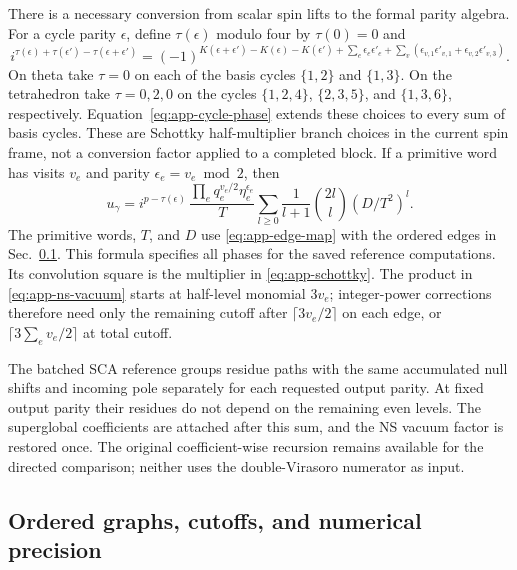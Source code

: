 There is a necessary conversion from scalar spin lifts to the formal
parity algebra. For a cycle parity $\epsilon$, define $\tau(\epsilon)$
modulo four by $\tau(0)=0$ and
\begin{equation}
 i^{\tau(\epsilon)+\tau(\epsilon')-\tau(\epsilon+\epsilon')}
 =(-1)^{K(\epsilon+\epsilon')-K(\epsilon)-K(\epsilon')
            +\sum_e\epsilon_e\epsilon'_e
            +\sum_v(\epsilon_{v,1}\epsilon'_{v,1}
                         +\epsilon_{v,2}\epsilon'_{v,3})}.
 \label{eq:app-cycle-phase}
\end{equation}
On theta take $\tau=0$ on each of the basis cycles $\{1,2\}$ and
$\{1,3\}$. On the tetrahedron take $\tau=0,2,0$ on the cycles
$\{1,2,4\}$, $\{2,3,5\}$, and $\{1,3,6\}$, respectively.
Equation~\eqref{eq:app-cycle-phase} extends these
choices to every sum of basis cycles. These are Schottky
half-multiplier branch choices in the current spin frame, not a
conversion factor applied to a completed block. If a primitive word has visits
$v_e$ and parity $\epsilon_e=v_e\bmod2$, then
\begin{equation}
 u_\gamma=
 i^{p-\tau(\epsilon)}\,
 \frac{\prod_e q_e^{v_e/2}\eta_e^{\epsilon_e}}{T}
 \sum_{l\ge0}\frac1{l+1}\binom{2l}{l}(D/T^2)^l.
 \label{eq:app-half-multiplier}
\end{equation}
The primitive words, $T$, and $D$ use \eqref{eq:app-edge-map} with
the ordered edges in Sec.~\ref{app:graphs}. This formula specifies all
phases for the saved reference computations. Its convolution square
is the multiplier in \eqref{eq:app-schottky}. The product in
\eqref{eq:app-ns-vacuum} starts at half-level monomial $3v_e$;
integer-power corrections therefore need only the remaining cutoff
after $\lceil3v_e/2\rceil$ on each edge, or
$\lceil3\sum_e v_e/2\rceil$ at total cutoff.

The batched SCA reference groups residue paths with the same accumulated
null shifts and incoming pole separately for each requested output parity.
At fixed output parity their residues do not depend on the remaining
even levels. The superglobal coefficients are attached after this sum,
and the NS vacuum factor is restored once. The original coefficient-wise
recursion remains available for the directed comparison; neither uses
the double-Virasoro numerator as input.

\subsection{Ordered graphs, cutoffs, and numerical precision}
\label{app:graphs}

